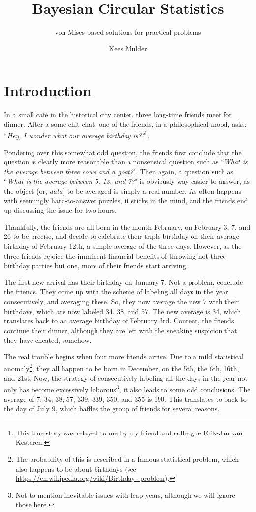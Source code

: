 \documentclass[12pt, a4paper]{book}\usepackage[]{graphicx}\usepackage[]{color}
\title{Bayesian Circular Statistics}
\subtitle{von Mises-based solutions for practical problems}
\author{Kees Mulder}
\begin{document}
\frontmatter

\maketitle

\tableofcontents



\mainmatter
\chapter{Introduction}
\label{intro}

In a small caf\'e in the historical city center, three long-time friends meet for dinner. After a some chit-chat, one of the friends, in a philosophical mood, asks: ``\textit{Hey, I wonder what our average birthday is?"}\footnote{This true story was relayed to me by my friend and colleague Erik-Jan van Kesteren.}.

Pondering over this somewhat odd question, the friends first conclude that the question is clearly more reasonable than a nonsensical question such as ``\textit{What is the average between three cows and a goat?}". Then again, a question such as ``\textit{What is the average between 5, 13, and 7?}" is obviously way easier to answer, as the object (or, \textit{data}) to be averaged is simply a real number. As often happens with seemingly hard-to-answer puzzles, it sticks in the mind, and the friends end up discussing the issue for two hours.

Thankfully, the friends are all born in the month February, on February 3, 7, and 26 to be precise, and decide to calebrate their triple birthday on their average birthday of February 12th, a simple average of the three days. However, as the three friends rejoice the imminent financial benefits of throwing not three birthday parties but one, more of their friends start arriving.

The first new arrival has their birthday on January 7. Not a problem, conclude the friends. They come up with the scheme of labeling all days in the year consecutively, and averaging these. So, they now average the new 7 with their birthdays, which are now labeled 34, 38, and 57. The new average is 34, which translates back to an average birthday of February 3rd. Content, the friends continue their dinner, although they are left with the sneaking suspicion that they have cheated, somehow.

%
The real trouble begins when four more friends arrive. Due to a mild statistical anomaly\footnote{The probability of this is described in a famous statistical problem, which also happens to be about birthdays (see \url{https://en.wikipedia.org/wiki/Birthday_problem}).}, they all happen to be born in December, on the 5th, the 6th,  16th, and 21st. Now, the strategy of consecutively labeling all the days in the year not only has become excessively laborous\footnote{Not to mention inevitable issues with leap years, although we will ignore those here.}, it also leads to some odd conclusions. The average of 7, 34, 38, 57, 339, 339, 350, and 355 is 190. This translates to back to the day of July 9, which baffles the group of friends for several reasons.
\end{document}
